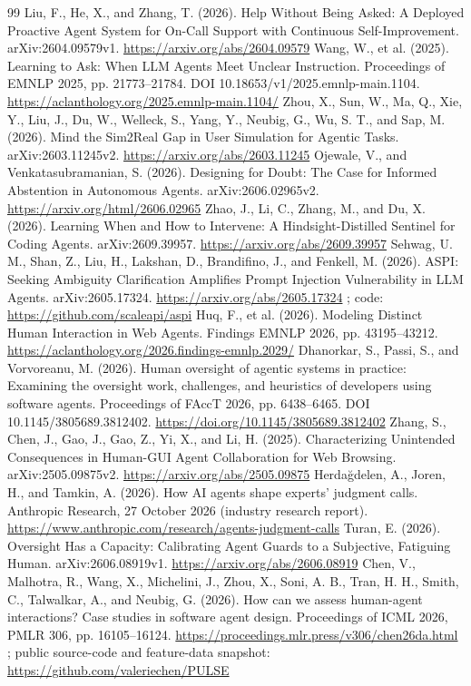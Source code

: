 \begin{thebibliography}{99}
 Liu, F., He, X., and Zhang, T. (2026). Help Without Being Asked: A Deployed Proactive Agent System for On-Call Support with Continuous Self-Improvement. arXiv:2604.09579v1. \url{https://arxiv.org/abs/2604.09579}
 Wang, W., et al. (2025). Learning to Ask: When LLM Agents Meet Unclear Instruction. Proceedings of EMNLP 2025, pp. 21773--21784. DOI 10.18653/v1/2025.emnlp-main.1104. \url{https://aclanthology.org/2025.emnlp-main.1104/}
 Zhou, X., Sun, W., Ma, Q., Xie, Y., Liu, J., Du, W., Welleck, S., Yang, Y., Neubig, G., Wu, S. T., and Sap, M. (2026). Mind the Sim2Real Gap in User Simulation for Agentic Tasks. arXiv:2603.11245v2. \url{https://arxiv.org/abs/2603.11245}
 Ojewale, V., and Venkatasubramanian, S. (2026). Designing for Doubt: The Case for Informed Abstention in Autonomous Agents. arXiv:2606.02965v2. \url{https://arxiv.org/html/2606.02965}
 Zhao, J., Li, C., Zhang, M., and Du, X. (2026). Learning When and How to Intervene: A Hindsight-Distilled Sentinel for Coding Agents. arXiv:2609.39957. \url{https://arxiv.org/abs/2609.39957}
 Sehwag, U. M., Shan, Z., Liu, H., Lakshan, D., Brandifino, J., and Fenkell, M. (2026). ASPI: Seeking Ambiguity Clarification Amplifies Prompt Injection Vulnerability in LLM Agents. arXiv:2605.17324. \url{https://arxiv.org/abs/2605.17324} ; code: \url{https://github.com/scaleapi/aspi}
 Huq, F., et al. (2026). Modeling Distinct Human Interaction in Web Agents. Findings EMNLP 2026, pp. 43195--43212. \url{https://aclanthology.org/2026.findings-emnlp.2029/}
 Dhanorkar, S., Passi, S., and Vorvoreanu, M. (2026). Human oversight of agentic systems in practice: Examining the oversight work, challenges, and heuristics of developers using software agents. Proceedings of FAccT 2026, pp. 6438--6465. DOI 10.1145/3805689.3812402. \url{https://doi.org/10.1145/3805689.3812402}
 Zhang, S., Chen, J., Gao, J., Gao, Z., Yi, X., and Li, H. (2025). Characterizing Unintended Consequences in Human-GUI Agent Collaboration for Web Browsing. arXiv:2505.09875v2. \url{https://arxiv.org/abs/2505.09875}
 Herdağdelen, A., Joren, H., and Tamkin, A. (2026). How AI agents shape experts' judgment calls. Anthropic Research, 27 October 2026 (industry research report). \url{https://www.anthropic.com/research/agents-judgment-calls}
 Turan, E. (2026). Oversight Has a Capacity: Calibrating Agent Guards to a Subjective, Fatiguing Human. arXiv:2606.08919v1. \url{https://arxiv.org/abs/2606.08919}
 Chen, V., Malhotra, R., Wang, X., Michelini, J., Zhou, X., Soni, A. B., Tran, H. H., Smith, C., Talwalkar, A., and Neubig, G. (2026). How can we assess human-agent interactions? Case studies in software agent design. Proceedings of ICML 2026, PMLR 306, pp. 16105--16124. \url{https://proceedings.mlr.press/v306/chen26da.html} ; public source-code and feature-data snapshot: \url{https://github.com/valeriechen/PULSE}

\end{thebibliography}
